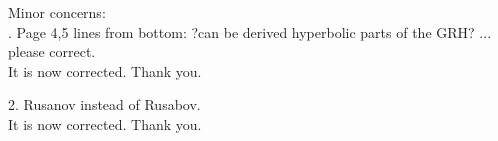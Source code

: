 \documentclass{article}
\begin{document}
{\color{blue}
\noindent Minor concerns: \\
. Page 4,5 lines from bottom: ?can be derived hyperbolic parts of the GRH? ... please correct.\\}
It is now corrected. Thank you.

\bigskip

{\color{blue}
 2. Rusanov instead of Rusabov.\\}
It is now corrected. Thank you.


\end{document}

